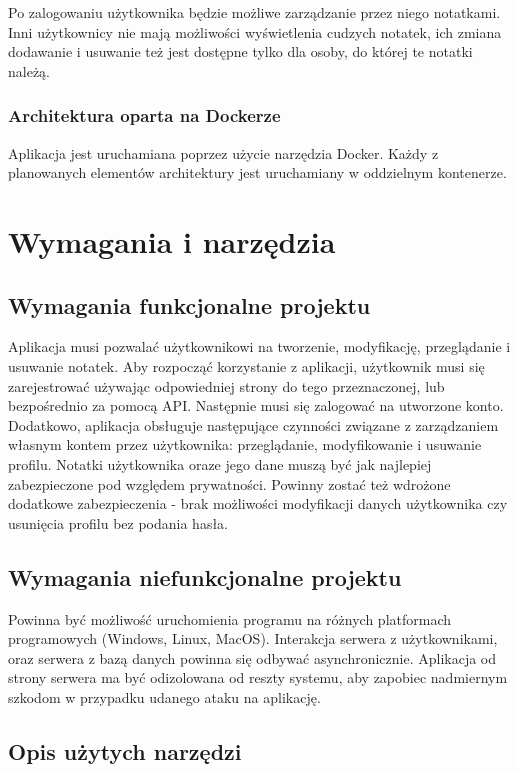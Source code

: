 \documentclass[a4paper,twoside,12pt]{book}
\begin{document}
Po zalogowaniu użytkownika będzie możliwe zarządzanie przez niego notatkami.
Inni użytkownicy nie mają możliwości wyświetlenia cudzych notatek, ich zmiana
dodawanie i usuwanie też jest dostępne tylko dla osoby, do której te notatki należą.

\subsection{Architektura oparta na Dockerze}
Aplikacja jest uruchamiana poprzez użycie narzędzia Docker.
Każdy z planowanych elementów architektury jest uruchamiany w oddzielnym kontenerze.



\chapter{Wymagania i narzędzia}
\label{ch:wymagania-i-narzedzia}

\section{Wymagania funkcjonalne projektu}
Aplikacja musi pozwalać użytkownikowi na tworzenie, modyfikację, przeglądanie i usuwanie notatek.
Aby rozpocząć korzystanie z aplikacji, użytkownik musi się zarejestrować używając odpowiedniej strony do tego
przeznaczonej, lub bezpośrednio za pomocą API. Następnie musi się zalogować na utworzone konto.
Dodatkowo, aplikacja obsługuje następujące czynności związane z zarządzaniem własnym kontem przez użytkownika:
przeglądanie, modyfikowanie i usuwanie profilu.
Notatki użytkownika oraze jego dane muszą być jak najlepiej zabezpieczone pod względem prywatności.
Powinny zostać też wdrożone dodatkowe zabezpieczenia - brak możliwości modyfikacji danych użytkownika
czy usunięcia profilu bez podania hasła. 

\section{Wymagania niefunkcjonalne projektu}
Powinna być możliwość uruchomienia programu na różnych platformach programowych (Windows, Linux, MacOS).
Interakcja serwera z użytkownikami, oraz serwera z bazą danych powinna się odbywać asynchronicznie.
Aplikacja od strony serwera ma być odizolowana od reszty systemu, aby zapobiec nadmiernym szkodom w 
przypadku udanego ataku na aplikację.

\section{Opis użytych narzędzi}
\end{document}
